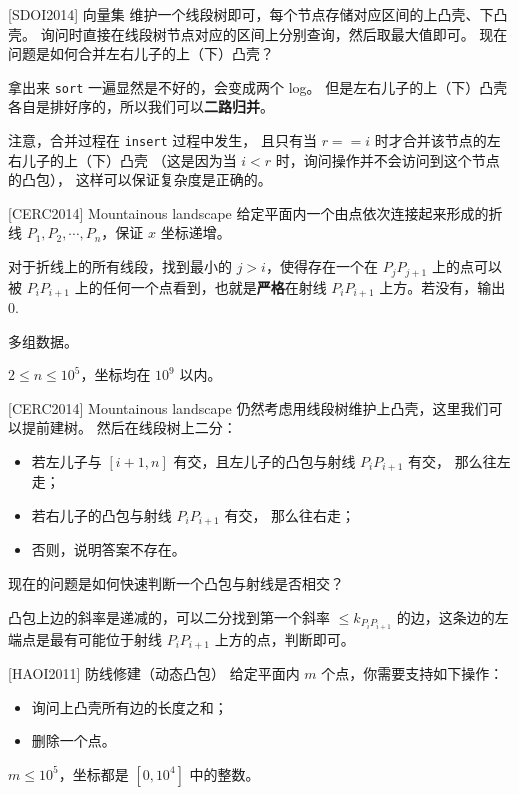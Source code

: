 \documentclass{beamer}
\begin{document}
\begin{frame}[fragile]{[SDOI2014] 向量集}
    \small
    维护一个线段树即可，每个节点存储对应区间的上凸壳、下凸壳。
    询问时直接在线段树节点对应的区间上分别查询，然后取最大值即可。
    现在问题是如何合并左右儿子的上（下）凸壳？

    \vspace{1em}\pause
    拿出来 \verb|sort| 一遍显然是不好的，会变成两个 log。
    但是左右儿子的上（下）凸壳各自是排好序的，所以我们可以\textbf{二路归并}。

    \vspace{1em}\pause
    注意，合并过程在 \verb|insert| 过程中发生，
    且只有当 $r==i$ 时才合并该节点的左右儿子的上（下）凸壳
    （这是因为当 $i<r$ 时，询问操作并不会访问到这个节点的凸包），
    这样可以保证复杂度是正确的。
\end{frame}

\begin{frame}{[CERC2014] Mountainous landscape}
    \small
    给定平面内一个由点依次连接起来形成的折线 $P_1,P_2,\cdots,P_n$，保证 $x$ 坐标递增。
    
    对于折线上的所有线段，找到最小的 $j>i$，使得存在一个在 $P_jP_{j+1}$ 上的点可以被 $P_iP_{i+1}$ 上的任何一个点看到，也就是\textbf{严格}在射线 $P_iP_{i+1}$ 上方。若没有，输出 $0$.
    
    多组数据。
    
    $2\le n\le 10^5$，坐标均在 $10^9$ 以内。
\end{frame}

\begin{frame}{[CERC2014] Mountainous landscape}
    \small
    仍然考虑用线段树维护上凸壳，这里我们可以提前建树。
    然后在线段树上二分：
    \begin{itemize}
    \pause \item 若左儿子与 $[i+1,n]$ 有交，且左儿子的凸包与射线 $P_{i}P_{i+1}$ 有交，
    那么往左走；
    \pause \item 若右儿子的凸包与射线 $P_{i}P_{i+1}$ 有交，
    那么往右走；
    \pause \item 否则，说明答案不存在。
    \end{itemize}

    现在的问题是如何快速判断一个凸包与射线是否相交？

    \pause
    凸包上边的斜率是递减的，可以二分找到第一个斜率 $\leq k_{P_{i}P_{i+1}}$
    的边，这条边的左端点是最有可能位于射线 $P_{i}P_{i+1}$ 上方的点，判断即可。
\end{frame}

\begin{frame}{[HAOI2011] 防线修建（动态凸包）}
    \small
    给定平面内 $m$ 个点，你需要支持如下操作：
    \begin{itemize}
        \item 询问上凸壳所有边的长度之和；
        \item 删除一个点。
    \end{itemize}
    $m\leq 10^5$，坐标都是 $[0,10^4]$ 中的整数。
\end{frame}
\end{document}
